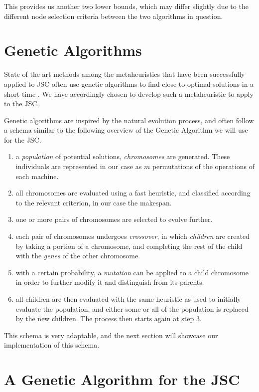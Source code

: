\documentclass{mimosis}
\begin{document}
This provides us another two lower bounds, which may differ slightly due to the different node selection criteria between the two algorithms in question.

\section{Genetic Algorithms}

State of the art methods among the metaheuristics that have been successfully applied to JSC often use genetic algorithms to find close-to-optimal solutions in a short time \citep{xiong2022survey}. We have accordingly chosen to develop such a metaheuristic to apply to the JSC.

Genetic algorithms \citep{holland1975adaptation} are inspired by the natural evolution process, and often follow a schema similar to the following overview of the Genetic Algorithm we will use for the JSC.

\begin{enumerate}
\item a \emph{population} of potential solutions, \emph{chromosomes} are generated. These individuals are represented in our case as \(m\) permutations of the operations of each machine.
\item all chromosomes are evaluated using a fast heuristic, and classified according to the relevant criterion, in our case the makespan.
\item one or more pairs of chromosomes are selected to evolve further.
\item each pair of chromosomes undergoes \emph{crossover}, in which \emph{children} are created by taking a portion of a chromosome, and completing the rest of the child with the \emph{genes} of the other chromosome. 
\item with a certain probability, a \emph{mutation} can be applied to a child chromosome in order to further modify it and distinguish from its parents.
\item all children are then evaluated with the same heuristic as used to initially evaluate the population, and either some or all of the population is replaced by the new children. The process then starts again at step 3.
\end{enumerate}

This schema is very adaptable, and the next section will showcase our implementation of this schema.

\section{A Genetic Algorithm for the JSC}
\end{document}
